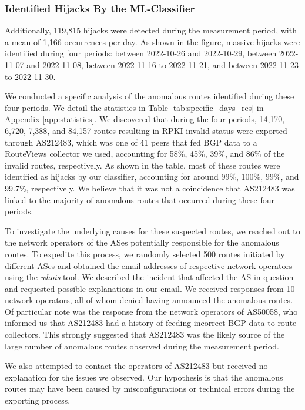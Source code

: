 \subsubsection{Identified Hijacks By the ML-Classifier}
Additionally, 119,815 hijacks were detected during the measurement period, with a mean of 1,166 occurrences per day.
As shown in the figure, massive hijacks were identified during four periods: between 2022-10-26 and 2022-10-29, between 2022-11-07 and 2022-11-08, between 2022-11-16 to 2022-11-21, and between 2022-11-23 to 2022-11-30.

We conducted a specific analysis of the anomalous routes identified during these four periods. We detail the statistics in Table \ref{tab:specific_days_res} in Appendix \ref{app:statistics}.
We discovered that during the four periods, 14,170, 6,720, 7,388, and 84,157 routes resulting in RPKI invalid status were exported through AS212483, which was one of 41 peers that fed BGP data to a RouteViews collector we used, accounting for 58\%, 45\%, 39\%, and 86\% of the invalid routes, respectively. As shown in the table, most of these routes were identified as hijacks by our classifier, accounting for around 99\%, 100\%, 99\%, and 99.7\%, respectively. We believe that it was not a coincidence that AS212483 was linked to the majority of anomalous routes that occurred during these four periods.

To investigate the underlying causes for these suspected routes, we reached out to the network operators of the ASes potentially responsible for the anomalous routes.
To expedite this process, we randomly selected 500 routes initiated by different ASes and obtained the email addresses of respective network operators using the \textit{whois} tool.
We described the incident that affected the AS in question and requested possible explanations in our email. We received responses from 10 network operators, all of whom denied having announced the anomalous routes. Of particular note was the response from the network operators of AS50058, who informed us that AS212483 had a history of feeding incorrect BGP data to route collectors.
This strongly suggested that AS212483 was the likely source of the large number of anomalous routes observed during the measurement period.

We also attempted to contact the operators of AS212483 but received no explanation for the issues we observed. Our hypothesis is that the anomalous routes may have been caused by misconfigurations or technical errors during the exporting process.

